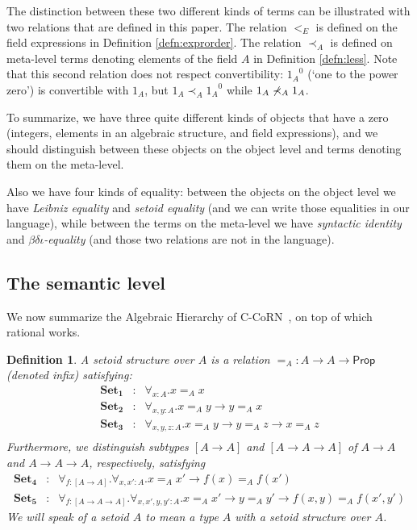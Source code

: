 \documentclass{article}
\newtheorem{definition}{Definition}[section]
\newcommand{\Prop}{{\textsf{Prop}}}
\newcommand{\tacticname}[1]{\textsf{#1}}
\newcommand{\rational}{\tacticname{rational}}
\newcommand{\less}{\mathrel{\prec_A}}
\newcommand{\axiom}[1]{\ensuremath{\mathbf{#1}}}
\begin{document}
The distinction between these two different kinds of terms
can be illustrated with two relations that are defined in this
paper.
The relation $<_E$ is defined on the field expressions in Definition \ref{defn:exprorder}.
The relation $\less$ is defined on meta-level terms denoting
elements of the field $A$ in Definition \ref{defn:less}.
Note that this second relation does not respect convertibility:
${1_A}^0$ (`one to the power zero') is convertible with $1_A$, but $1_A \less {1_A}^0$ while $1_A \not\less 1_A$.

\medskip
\noindent
To summarize, we have three quite different kinds of objects that have a zero
(integers, elements in an algebraic structure, and field expressions),
and we should distinguish between these objects on the object level
and terms denoting them on the meta-level.

Also we have four kinds of equality:
between the objects on the object level we have
\emph{Leibniz equality} and \emph{setoid equality} (and we
can write those equalities in our language), while
between the terms on the meta-level we have
\emph{syntactic identity} and
\emph{$\beta\delta\iota$-equality}
(and those two relations are not in the language).


\subsection{The semantic level}\label{structures}

We now summarize the Algebraic Hierarchy of C-CoRN~\cite{geu:pol:wie:zwa:02},
on top of which {\rational} works.

\begin{definition}
A \emph{setoid structure} over $A$ is a relation
$=_A:A\to A\to\Prop$ (denoted infix) satisfying:
\begin{eqnarray*}
\axiom{Set_1} & : & \forall_{x:A}.x=_A x \\
\axiom{Set_2} & : & \forall_{x,y:A}.x=_A y\to y=_A x\\
\axiom{Set_3} & : & \forall_{x,y,z:A}.x=_A y\to y=_A z\to x=_A z\\
\end{eqnarray*}
Furthermore, we distinguish subtypes $[A\to A]$ and $[A\to A\to A]$ of
$A\to A$ and $A\to A\to A$, respectively, satisfying
\begin{eqnarray*}
\axiom{Set_4} & : &
 \forall_{f:[A\to A]}.\forall_{x,x':A}.x=_A x'\to f(x)=_A f(x')\\
\axiom{Set_5} & : & \forall_{f:[A\to A\to A]}.
 \forall_{x,x',y,y':A}.x=_A x'\to y=_A y'\to f(x,y)=_A f(x',y')
\end{eqnarray*}
We will speak of a setoid $A$ to mean a type $A$ with a setoid structure over
$A$.
\end{definition}
\end{document}
